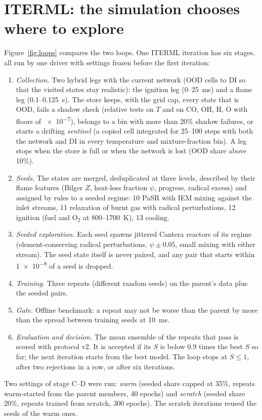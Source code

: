 \documentclass[preprint,review,12pt]{elsarticle}
\begin{document}
\section{ITERML: the simulation chooses where to explore}
\label{sec:iterml}

Figure~\ref{fig:loops} compares the two loops. One ITERML iteration has six stages, all run by one driver
with settings frozen before the first iteration:
\begin{enumerate}
\item[A] \emph{Collection.} Two hybrid legs with the current network (OOD cells to DI so that the visited
  states stay realistic): the ignition leg (0--25~ms) and a flame leg (0.1--0.125~s). The store keeps, with
  the grid cap, every state that is OOD, fails a shadow check (relative tests on $T$ and on CO, OH, H, O
  with floors of \num{e-7}), belongs to a bin with more than 20\% shadow failures, or starts a drifting
  \emph{sentinel} (a copied cell integrated for 25--100 steps with both the network and DI in every
  temperature and mixture-fraction bin). A leg stops when the store is full or when the network is lost
  (OOD share above 10\%).
\item[B] \emph{Seeds.} The states are merged, deduplicated at three levels, described by their flame
  features (Bilger $Z$, heat-loss fraction $\psi$, progress, radical excess) and assigned by rules to a
  seeded regime: 10 PaSR with IEM mixing against the inlet streams, 11 relaxation of burnt gas with radical
  perturbations, 12 ignition (fuel and O$_2$ at 800--1700~K), 13 cooling.
\item[C] \emph{Seeded exploration.} Each seed spawns jittered Cantera reactors of its regime
  (element-conserving radical perturbations, $\psi\pm0.05$, small mixing with either stream). The seed state
  itself is never paired, and any pair that starts within \num{1e-8} of a seed is dropped.
\item[D] \emph{Training.} Three repeats (different random seeds) on the parent's data plus the seeded
  pairs.
\item[E] \emph{Gate.} Offline benchmark: a repeat may not be worse than the parent by more than the spread
  between training seeds at 10~ms.
\item[F] \emph{Evaluation and decision.} The mean ensemble of the repeats that pass is scored with protocol
  v2. It is accepted if its $S$ is below 0.9 times the best $S$ so far; the next iteration starts from the
  best model. The loop stops at $S\le1$, after two rejections in a row, or after six iterations.
\end{enumerate}
Two settings of stage C--D were run: \emph{warm} (seeded share capped at 35\%, repeats warm-started from the
parent members, 40 epochs) and \emph{scratch} (seeded share 20\%, repeats trained from scratch, 300 epochs).
The scratch iterations reused the seeds of the warm ones.
\end{document}
